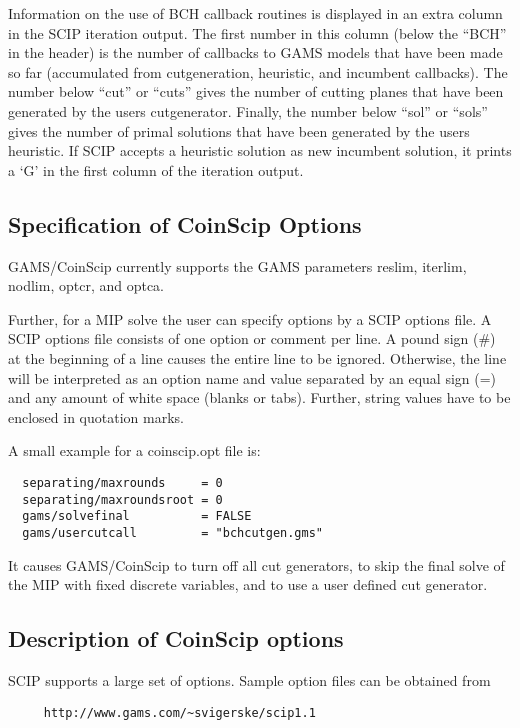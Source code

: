 Information on the use of BCH callback routines is displayed in an extra column in the SCIP iteration output.
The first number in this column (below the ``BCH'' in the header) is the number of callbacks to GAMS models that have been made so far (accumulated from cutgeneration, heuristic, and incumbent callbacks).
The number below ``cut'' or ``cuts'' gives the number of cutting planes that have been generated by the users cutgenerator.
Finally, the number below ``sol'' or ``sols'' gives the number of primal solutions that have been generated by the users heuristic.
If SCIP accepts a heuristic solution as new incumbent solution, it prints a `G' in the first column of the iteration output.

\subsection{Specification of CoinScip Options}

GAMS/CoinScip currently supports the GAMS parameters reslim, iterlim, nodlim, optcr, and optca.

Further, for a MIP solve the user can specify options by a SCIP options file.
A SCIP options file consists of one option or comment per line.
A pound sign (\#) at the beginning of a line causes the entire line to be ignored.
Otherwise, the line will be interpreted as an option name and value separated by an equal sign (=) and any amount of white space (blanks or tabs).
Further, string values have to be enclosed in quotation marks.

A small example for a coinscip.opt file is:
\begin{verbatim}
  separating/maxrounds     = 0
  separating/maxroundsroot = 0
  gams/solvefinal          = FALSE
  gams/usercutcall         = "bchcutgen.gms"
\end{verbatim}
It causes GAMS/CoinScip to turn off all cut generators, to skip the final solve of the MIP with fixed discrete variables, and to use a user defined cut generator.

\subsection{Description of CoinScip options}

SCIP supports a large set of options.
Sample option files can be obtained from
\begin{verbatim}
     http://www.gams.com/~svigerske/scip1.1
\end{verbatim}

